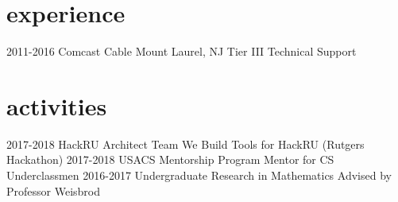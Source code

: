 \documentclass[]{friggeri-cv}
\begin{document}
\section{experience}
\begin{entrylist}
  \entry
    {2011-2016}
    {Comcast Cable}
    {Mount Laurel, NJ}
    {Tier III Technical Support}
\end{entrylist}

\section{activities}
    \begin{entrylist}
        \entry
        {2017-2018}
        {HackRU Architect Team}
        {We Build Tools for HackRU (Rutgers Hackathon)}
        {\vspace{-0.3cm}}
        \entry
        {2017-2018}
        {USACS Mentorship Program}
        {Mentor for CS Underclassmen}
        {\vspace{-0.3cm}}
        \entry
        {2016-2017}
        {Undergraduate Research in Mathematics}
        {Advised by Professor Weisbrod}
        {}
    \end{entrylist}
    \vspace{-1.0cm}
\end{document}
